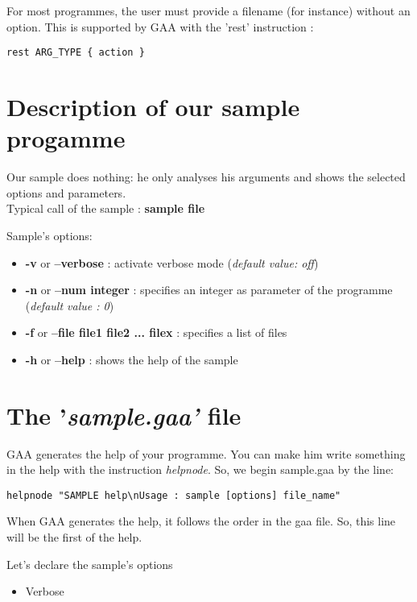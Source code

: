 \par
For most programmes, the user must provide a filename
(for instance) without an option. This is supported by GAA with the 'rest'
instruction :
\begin{verbatim}
rest ARG_TYPE { action }
\end{verbatim}

\section{ Description of our sample progamme}
Our sample does nothing: he only analyses his arguments and shows
the selected options and parameters. \\
Typical call of the sample : {\bf sample file}

\par
Sample's options:
\begin{itemize}
\item {\bf -v} or {\bf --verbose }: activate verbose mode ({\it default value: off})

\item {\bf -n} or {\bf --num integer} : specifies an integer as parameter of
the programme ({\it default value : 0})

\item {\bf -f} or {\bf --file file1 file2 ... filex} : specifies a list of
files

\item {\bf -h} or {\bf --help} : shows the help of the sample
\end{itemize}

\section{The '{\it sample.gaa'} file}
GAA generates the help of your programme. You can make him write something
in the help with the instruction {\it helpnode}. So, we begin sample.gaa
by the line:

\begin{verbatim}
helpnode "SAMPLE help\nUsage : sample [options] file_name"
\end{verbatim}

When GAA generates the help, it follows the order in the gaa file.
So, this line will be the first of the help.

\par
Let's declare the sample's options
\begin{itemize}
\item Verbose
\end{itemize}

